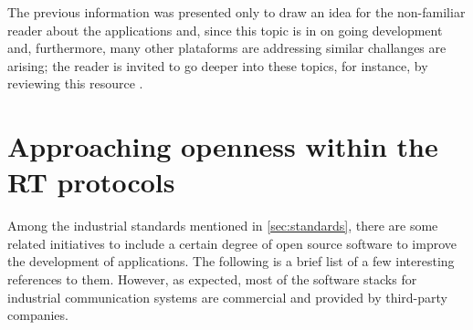 The previous information was presented only to draw an idea for the non-familiar reader about the applications and, since this topic is in on going development 
and, furthermore, many other plataforms are addressing similar challanges are arising; the reader is invited
to go deeper into these topics, for instance, by reviewing this resource \cite{middleware_industrial}. %

\section{Approaching openness within the RT protocols}\label{sec:openness}

Among the industrial standards mentioned in \ref{sec:standards}, there are some related initiatives to include a certain degree of open source
software to improve the development of applications. The following is a brief list of a few interesting references to them. 
However, as expected, most of the software stacks
for industrial communication systems are commercial and provided by third-party companies. 

